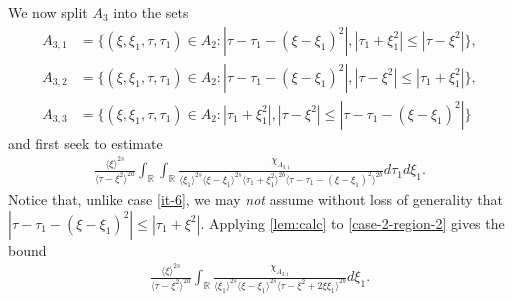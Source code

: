 \documentclass[12pt,reqno]{amsart}
\numberwithin{equation}{section}  %
\numberwithin{figure}{section}
\newcommand{\rr}{\mathbb{R}}
\theoremstyle{plain}
\theoremstyle{definition}
\theoremstyle{remark}
\begin{document}
%
%
We now split $A_{3}$ into the sets
%
%
%
\begin{align*}
A_{3,1}&=\{(\xi, \xi_1, \tau, \tau_1)\in A_2:
|\tau-\tau_1-(\xi-\xi_1)^2|, |\tau_1+\xi_1^2| \le |\tau-\xi^2|\},\\
A_{3,2}&=\{(\xi, \xi_1, \tau, \tau_1)\in A_2:
|\tau-\tau_1-(\xi-\xi_1)^2|, |\tau-\xi^2| \le |\tau_1+\xi_1^2|\},\\
A_{3,3}&=\{(\xi, \xi_1, \tau, \tau_1)\in A_2: |\tau_{1}+\xi_{1}^2|, | \tau - \xi^{2} | \le |  \tau - \tau_{1} -
(\xi - \xi_{1})^{2} |\}
\end{align*} 
and first seek to estimate
%
%
\begin{equation}
  \label{case-2-region-2}
  \begin{split}
    \frac{ \langle \xi
    \rangle ^{2s}}{\langle \tau - \xi^{2} \rangle ^{2a}}
    \int_{\rr} \int_{\rr} \frac{\chi_{A_{3,1}}}{ \langle \xi_{1} \rangle ^{2s} \langle \xi-\xi_{1} \rangle ^{2s} 
    \langle \tau_{1} + \xi_{1}^{2} \rangle^{2b} \langle  \tau - \tau_{1} -
    (\xi - \xi_{1})^{2} \rangle^{2b} }
    d \tau_1 d \xi_{1}.
  \end{split}
\end{equation}
Notice that, unlike case \eqref{it-6}, we may \emph{not} assume without loss of generality
that $|\tau - \tau_{1} - (\xi - \xi_1)^{2} | \le | \tau_{1} + \xi^{2} | $.
Applying \autoref{lem:calc} to \eqref{case-2-region-2} gives the bound
%
%
\begin{equation*}
  \begin{split}
    \frac{ \langle \xi
    \rangle ^{2s}}{\langle \tau - \xi^{2} \rangle ^{2a}}
    \int_{\rr} \frac{\chi_{A_{3,1}}}{ \langle \xi_{1} \rangle ^{2s} \langle \xi-\xi_{1} \rangle ^{2s} 
    \langle \tau - \xi^{2} +2 \xi \xi_{1} \rangle^{2b} } d \xi_{1}.
  \end{split}
\end{equation*}
\end{document}
